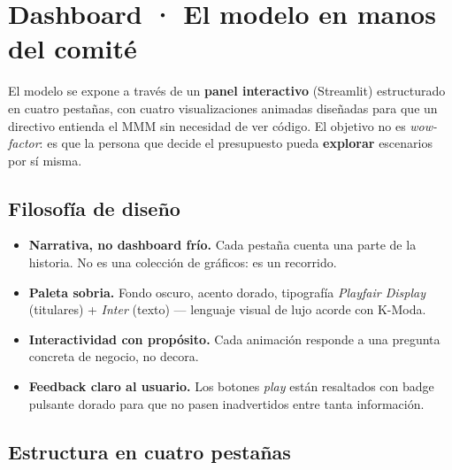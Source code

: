 \section{Dashboard · El modelo en manos del comité}

\begin{takeaway}
El modelo se expone a través de un \textbf{panel interactivo} (Streamlit) estructurado en cuatro pestañas, con cuatro visualizaciones animadas diseñadas para que un directivo entienda el MMM sin necesidad de ver código. El objetivo no es \textit{wow-factor}: es que la persona que decide el presupuesto pueda \textbf{explorar} escenarios por sí misma.
\end{takeaway}

\subsection{Filosofía de diseño}

\begin{itemize}[leftmargin=*, itemsep=2pt]
    \item \textbf{Narrativa, no dashboard frío.} Cada pestaña cuenta una parte de la historia. No es una colección de gráficos: es un recorrido.
    \item \textbf{Paleta sobria.} Fondo oscuro, acento dorado, tipografía \textit{Playfair Display} (titulares) + \textit{Inter} (texto) — lenguaje visual de lujo acorde con K-Moda.
    \item \textbf{Interactividad con propósito.} Cada animación responde a una pregunta concreta de negocio, no decora.
    \item \textbf{Feedback claro al usuario.} Los botones \textit{play} están resaltados con badge pulsante dorado para que no pasen inadvertidos entre tanta información.
\end{itemize}

\subsection{Estructura en cuatro pestañas}

